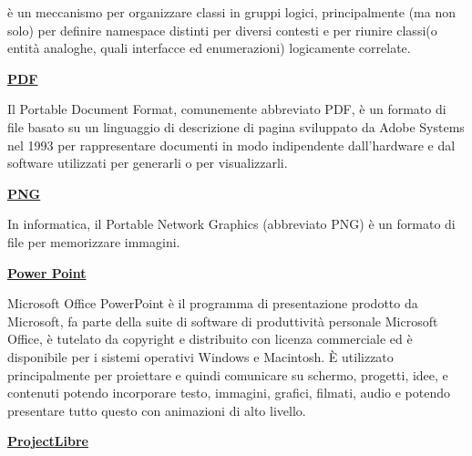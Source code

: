 \medskip
\begin{addmargin}[5em]{1em}	
è un meccanismo per organizzare classi in gruppi logici, principalmente (ma non solo) per definire namespace distinti per diversi contesti e per riunire classi(o entità analoghe, quali interfacce ed enumerazioni) logicamente correlate.
\end{addmargin}	

\bigskip

\begin{addmargin}[0em]{0em}	
	\textbf{\underline{PDF}} 
\end{addmargin}

\medskip
\begin{addmargin}[5em]{1em}	
Il Portable Document Format, comunemente abbreviato PDF, è un formato di file basato su un linguaggio di descrizione di pagina sviluppato da Adobe Systems nel 1993 per rappresentare documenti in modo indipendente dall'hardware e dal software utilizzati per generarli o per visualizzarli.
\end{addmargin}	

\bigskip
\begin{addmargin}[0em]{0em}	
	\textbf{\underline{PNG}} 
\end{addmargin}
\medskip
\begin{addmargin}[5em]{1em}
In informatica, il Portable Network Graphics (abbreviato PNG) è un formato di file per memorizzare immagini.
\end{addmargin}	

\bigskip
\begin{addmargin}[0em]{0em}	
	\textbf{\underline{Power Point}}
\end{addmargin} 

\medskip
\begin{addmargin}[5em]{1em}
Microsoft Office PowerPoint è il programma di presentazione prodotto da Microsoft, fa parte della suite di software di produttività personale Microsoft Office, è tutelato da copyright e distribuito con licenza commerciale ed è disponibile per i sistemi operativi Windows e Macintosh. È utilizzato principalmente per proiettare e quindi comunicare su schermo, progetti, idee, e contenuti potendo incorporare testo, immagini, grafici, filmati, audio e potendo presentare tutto questo con animazioni di alto livello.
\end{addmargin}	

\bigskip
\begin{addmargin}[0em]{0em}	
	\textbf{\underline{ProjectLibre}} 
\end{addmargin}
	
